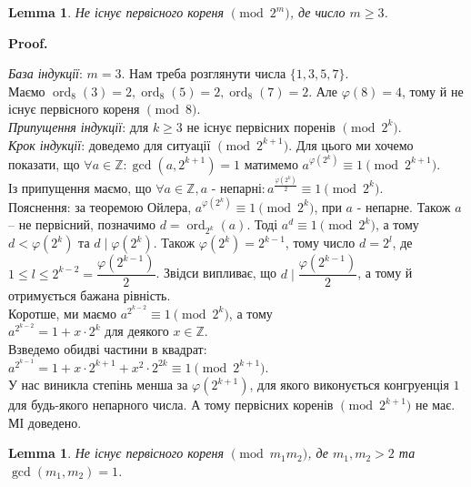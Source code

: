 \documentclass[a4paper, 14pt]{extarticle}
\makeatletter
\theoremstyle{theoremdd}
\theoremstyle{theoremdd}
\theoremstyle{theoremdd}
\theoremstyle{theoremdd}
\theoremstyle{theoremdd}
\theoremstyle{theoremdd}
\theoremstyle{theoremdd}
\newtheorem{lemma}[theorem]{Lemma}
\theoremstyle{theoremdd}
\def\qed{$\blacksquare$}
\renewenvironment{proof}[1][Proof.\\]{\par
\pushQED{\hfill \qed}%
\normalfont \topsep6\p@\@plus6\p@\relax
\trivlist
\item\relax
{\bfseries
#1\@addpunct{.}}\hspace\labelsep\ignorespaces
}{%
\popQED\endtrivlist\@endpefalse
}
\DeclareMathOperator{\ord}{ord}
\makeatother
\begin{document}
\begin{lemma}
Не існує первісного кореня $\!\! \pmod {2^m}$, де число $m \geq 3$.
\end{lemma}

\begin{proof}
\textit{База індукції}: $m = 3$. Нам треба розглянути числа $\{1,3,5,7\}$. \\
Маємо $\ord_8 (3) = 2, \ord_8 (5) = 2, \ord_8 (7) = 2$. Але $\varphi(8) = 4$, тому й не існує первісного кореня $\pmod 8$.\\
\textit{Припущення індукції}: для $k \geq 3$ не існує первісних поренів $\pmod {2^k}$.\\
\textit{Крок індукції}: доведемо для ситуації $\pmod {2^{k+1}}$. Для цього ми хочемо показати, що $\forall a \in \mathbb{Z}: \gcd(a,2^{k+1}) = 1$ матимемо $a^{\varphi(2^k)} \equiv 1 \pmod {2^{k+1}}$.\\
Із припущення маємо, що $\forall a \in \mathbb{Z}, a \text{ - непарні}: a^{\frac{\varphi(2^k)}{2}} \equiv 1 \pmod {2^k}$.\\
Пояснення: за теоремою Ойлера, $a^{\varphi(2^k)} \equiv 1 \pmod {2^k}$, при $a$ - непарне. Також $a$ -- не первісний, позначимо $d = \ord_{2^k}(a)$. Тоді $a^d \equiv 1 \pmod {2^k}$, а тому $d < \varphi(2^k)$ та $d \mid \varphi(2^k)$. Також $\varphi(2^k) = 2^{k-1}$, тому число $d = 2^l$, де $1 \leq l \leq 2^{k-2} = \dfrac{\varphi(2^{k-1})}{2}$. Звідси випливає, що $d \mid \dfrac{\varphi(2^{k-1})}{2}$, а тому й отримується бажана рівність.\\
Коротше, ми маємо $a^{2^{k-2}} \equiv 1 \pmod {2^k}$, а тому \\
$a^{2^{k-2}} = 1 + x \cdot 2^k$ для деякого $x \in \mathbb{Z}$.\\
Взведемо обидві частини в квадрат:\\
$a^{2^{k-1}} = 1 + x \cdot 2^{k+1} + x^2 \cdot 2^{2k} \equiv 1 \pmod {2^{k+1}}$.\\
У нас виникла степінь менша за $\varphi(2^{k+1})$, для якого виконується конгруенція $1$ для будь-якого непарного числа. А тому первісних коренів $\pmod {2^{k+1}}$ не має.\\
МІ доведено.
\end{proof}

\begin{lemma}
Не існує первісного кореня $\!\! \pmod {m_1m_2}$, де $m_1,m_2 > 2$ та $\gcd(m_1,m_2) = 1$.
\end{lemma}
\end{document}
